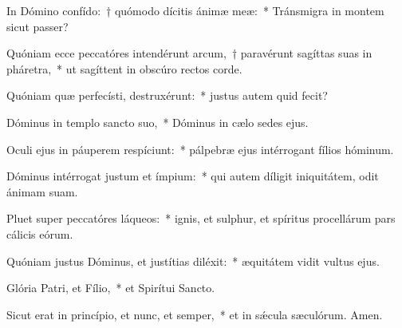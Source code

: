 \item In Dómino confído:~† quómodo dícitis ánimæ meæ:~* Tránsmigra in montem sicut passer?

\item Quóniam ecce peccatóres intendérunt arcum,~† paravérunt sagíttas suas in pháretra,~* ut sagíttent in obscúro rectos corde.

\item Quóniam quæ perfecísti, destruxérunt:~* justus autem quid fecit?

\item Dóminus in templo sancto suo,~* Dóminus in cælo sedes ejus.

\item Oculi ejus in páuperem respíciunt:~* pálpebræ ejus intérrogant fílios hóminum.

\item Dóminus intérrogat justum et ímpium:~* qui autem díligit iniquitátem, odit ánimam suam.

\item Pluet super peccatóres láqueos:~* ignis, et sulphur, et spíritus procellárum pars cálicis eórum.

\item Quóniam justus Dóminus, et justítias diléxit:~* æquitátem vidit vultus ejus.

\item Glória Patri, et Fílio,~* et Spirítui Sancto.

\item Sicut erat in princípio, et nunc, et semper,~* et in sǽcula sæculórum. Amen.

